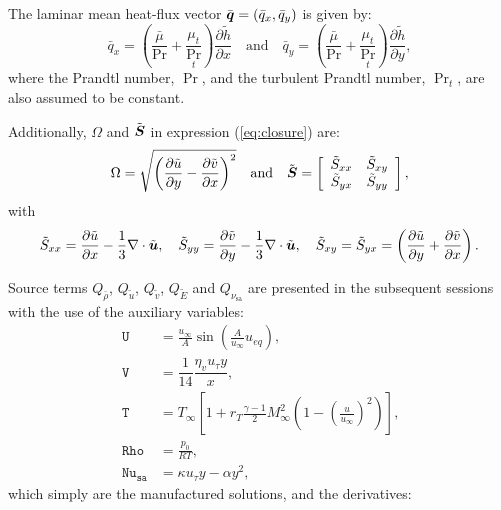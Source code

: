 \documentclass[10pt]{article}
\newcommand{\diff}[2] {\dfrac{\partial #1}{\partial #2}}
\newcommand{\bv}[1]{\ensuremath{\mbox{\boldmath$ #1 $}}}
\newcommand{\Rho}{\,\mathtt{Rho}}
\newcommand{\U}{\,\mathtt{U}}
\newcommand{\V}{\,\mathtt{V}}
\newcommand{\Nu}{\,\mathtt{Nu_{sa}}}
\newcommand{\T}{\,\mathtt{T}}
\newcommand{\sa}{\nu_{\mathrm{sa}}}
\newcommand{\brho}{\bar{\rho}}
\newcommand{\tu}{\tilde{u}}
\newcommand{\tv}{\tilde{v}}
\newcommand{\tS}{\tilde{S}}
\newcommand{\tE}{\tilde{E}}
\begin{document}
 The laminar mean heat-flux vector $\bar{\bv{q}}=(\bar{q}_x,\bar{q}_y)$ is given by:
%
\begin{equation}\label{eq:closure02}
 \bar{q}_x = \left(\dfrac{\bar{\mu}}{\Pr}+\dfrac{\mu_t}{\Pr_t}\right)\diff{\tilde{h}}{x}\quad \mbox{and} \quad \bar{q}_y = \left(\dfrac{\bar{\mu}}{\Pr}+\dfrac{\mu_t}{\Pr_t}\right)\diff{\tilde{h}}{y},
 \end{equation}
where the Prandtl number, $\Pr$, and the turbulent Prandtl number, $\Pr_t$, are also assumed to be constant.

Additionally, $\Omega$ and $\tilde{\bv{S}}$ in expression (\ref{eq:closure}) are:
\begin{gather*}
\label{eq:closure03}
 \Omega = \sqrt{\left( \diff{\tilde{u}}{y} - \diff{\tilde{v}}{x}\right)^2} \quad \mbox{and}\quad 
\tilde{\bv{S}}=\left[
\begin{array}{cc}
\tS_{xx} & \tS_{xy}\\
\tS_{yx} & \tS_{yy}
\end{array}\right] , 
\end{gather*}
with
\begin{equation*}
\tS_{xx}= \diff{\tilde{u}}{x}-\dfrac{1}{3} \nabla \cdot \tilde{\bv{u}},\quad \tS_{yy}= \diff{\tilde{v}}{y}-\dfrac{1}{3} \nabla \cdot \tilde{\bv{u}}, \quad \tS_{xy}= \tS_{yx}= \left( \diff{\tilde{u}}{y} + \diff{\tilde{v}}{x}\right).\\
\end{equation*}




Source terms $Q_{\brho}$, $Q_{\tu}$, $Q_{\tv}$, $Q_{\tE}$ and $Q_{\sa}$ are presented in the subsequent sessions with the use of the auxiliary variables:
\begin{equation}
\label{eq:aux_2d}
\begin{split}
\U &= \frac{u_{\infty}}{A} \sin \left( \frac{A}{u_{\infty}} u_{eq} \right),\\
\V &= \dfrac{1}{14} \dfrac{\eta_v u_{\tau} y}{x},\\
\T &= T_{\infty} \left[ 1 + r_T \frac{\gamma - 1}{2} M_{\infty}^2 \left( 1 - \left(\frac{u}{u_{\infty}}\right)^2 \right) \right],\\
\Rho &= \frac{p_0}{R T},\\
\Nu &= \kappa u_{\tau} y - \alpha y^2,
\end{split}
\end{equation}
which simply are the manufactured solutions, and the derivatives: 
\end{document}
